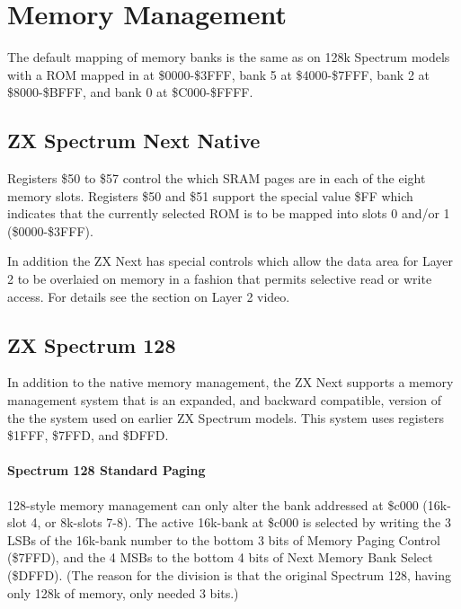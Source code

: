 \section{Memory Management}
The default mapping of memory banks is the same as on 128k Spectrum
models with a ROM mapped in at \$0000-\$3FFF, bank 5 at \$4000-\$7FFF,
bank 2 at \$8000-\$BFFF, and bank 0 at \$C000-\$FFFF.

\subsection{ZX Spectrum Next Native}
Registers \$50 to \$57 control the which SRAM pages are in each of the
eight memory slots.  Registers \$50 and \$51 support the special value
\$FF which indicates that the currently selected ROM is to be mapped
into slots 0 and/or 1 (\$0000-\$3FFF).










In addition the ZX Next has special controls which allow the data area
for Layer 2 to be overlaied on memory in a fashion that permits
selective read or write access. For details see the section on Layer 2
video.

\subsection{ZX Spectrum 128}
In addition to the native memory management, the ZX Next supports a
memory management system that is an expanded, and backward compatible,
version of the the system used on earlier ZX Spectrum models. This
system uses registers \$1FFF, \$7FFD, and \$DFFD.

\paragraph{Spectrum 128 Standard Paging}

128-style memory management can only alter the bank addressed at
\$c000 (16k-slot 4, or 8k-slots 7-8). The active 16k-bank at \$c000 is
selected by writing the 3 LSBs of the 16k-bank number to the bottom 3
bits of Memory Paging Control (\$7FFD), and the 4 MSBs to the bottom 4
bits of Next Memory Bank Select (\$DFFD). (The reason for the division
is that the original Spectrum 128, having only 128k of memory, only
needed 3 bits.)

